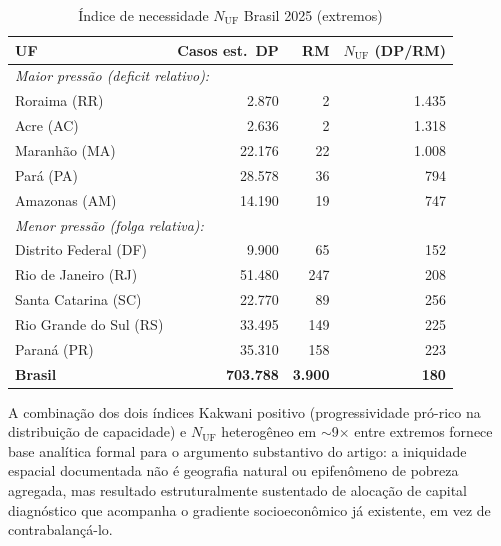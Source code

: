 \documentclass[12pt,a4paper,oneside]{article}
\begin{document}
\begin{table}[htbp]
\centering
\caption{Índice de necessidade $N_{\text{UF}}$ \textendash{} Brasil
2025 (extremos)}
\begin{tabular}{lrrr}
\toprule
\textbf{UF} & \textbf{Casos est.\ DP} & \textbf{RM} & \textbf{$N_{\text{UF}}$ (DP/RM)} \\
\midrule
\multicolumn{4}{l}{\textit{Maior pressão (deficit relativo):}} \\
Roraima (RR)         & 2.870  & 2   & 1.435 \\
Acre (AC)            & 2.636  & 2   & 1.318 \\
Maranhão (MA)        & 22.176 & 22  & 1.008 \\
Pará (PA)            & 28.578 & 36  & 794   \\
Amazonas (AM)        & 14.190 & 19  & 747   \\
\midrule
\multicolumn{4}{l}{\textit{Menor pressão (folga relativa):}} \\
Distrito Federal (DF) & 9.900  & 65  & 152   \\
Rio de Janeiro (RJ)  & 51.480 & 247 & 208   \\
Santa Catarina (SC)  & 22.770 & 89  & 256   \\
Rio Grande do Sul (RS)& 33.495 & 149 & 225   \\
Paraná (PR)          & 35.310 & 158 & 223   \\
\midrule
\textbf{Brasil}      & \textbf{703.788} & \textbf{3.900} & \textbf{180} \\
\bottomrule
\end{tabular}
\par{}
\label{tab:necessidade}
\end{table}

A combinação dos dois índices \textemdash{} Kakwani positivo
(progressividade pró-rico na distribuição de capacidade) e
$N_{\text{UF}}$ heterogêneo em $\sim$9$\times$ entre extremos
\textemdash{} fornece base analítica formal para o argumento
substantivo do artigo: a iniquidade espacial documentada não é
geografia natural ou epifenômeno de pobreza agregada, mas resultado
estruturalmente sustentado de alocação de capital diagnóstico que
acompanha o gradiente socioeconômico já existente, em vez de
contrabalançá-lo.
\end{document}
